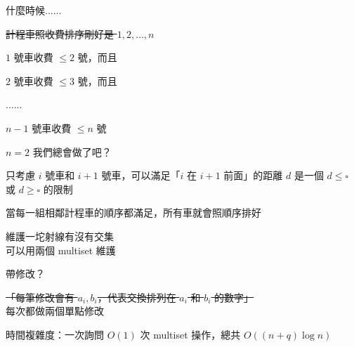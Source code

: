 \begin{frame}{}
    什麼時候......

    \begin{itemize}
        \item {} \sout<2->{計程車照收費排序剛好是 $1, 2, \dots, n$}
         {
            \item {} $1$ 號車收費 $\leq 2$ 號，而且
            \item {} $2$ 號車收費 $\leq 3$ 號，而且
            \item ......
            \item {} $n - 1$ 號車收費 $\leq n$ 號
        }
    \end{itemize}

     {
        $n = 2$ 我們總會做了吧？
    }
\end{frame}

\begin{frame}{}
    只考慮 $i$ 號車和 $i + 1$ 號車，可以滿足「$i$ 在 $i + 1$ 前面」的距離 $d$ 是一個 $d \leq \square$ 或 $d \geq \square$ 的限制

    當每一組相鄰計程車的順序都滿足，所有車就會照順序排好
    
     {
        維護一坨射線有沒有交集 \\
        可以用兩個 multiset 維護
    }
\end{frame}

\begin{frame}{}
    帶修改？

    \sout<2->{「每筆修改會有 $a_i,b_i$，代表交換排列在 $a_i$ 和 $b_i$ 的數字」}
     {
        \\每次都做兩個單點修改
    }

     {
        時間複雜度：一次詢問 $O(1)$ 次 multiset 操作，總共 $O((n + q) \log n)$
    }
\end{frame}

